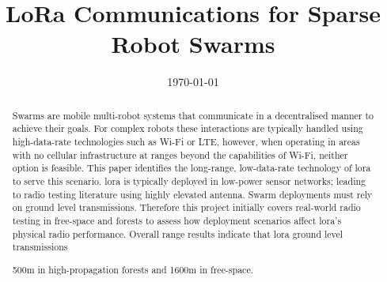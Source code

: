 \documentclass{ecsproject}
\begin{document}
\frontmatter
\title      {LoRa Communications for Sparse Robot Swarms}
\addresses  {\groupname\\\deptname\\\univname}
\date       {\today}
\subject    {}
\keywords   {}
\maketitle

\begin{abstract}
Swarms are mobile multi-robot systems that communicate in a decentralised manner to achieve their goals. For complex robots these interactions are typically handled using high-data-rate technologies such as Wi-Fi or LTE, however, when operating in areas with no cellular infrastructure at ranges beyond the capabilities of Wi-Fi, neither option is feasible.  This paper identifies the long-range, low-data-rate technology of \ac{lora} to serve this scenario. \ac{lora} is typically deployed in low-power sensor networks; leading to radio testing literature using highly elevated antenna. Swarm deployments must rely on ground level transmissions. Therefore this project initially covers real-world radio testing in free-space and forests to assess how deployment scenarios affect \ac{lora}'s physical radio performance. Overall range results indicate that \ac{lora} ground level transmissions


 500m in high-propagation forests and 1600m in free-space.


%
%
%
%
%
%
%
%
%
%  
%
%
%
%
%
%
% 
%
%
%
%
%





\end{abstract}
\end{document}
